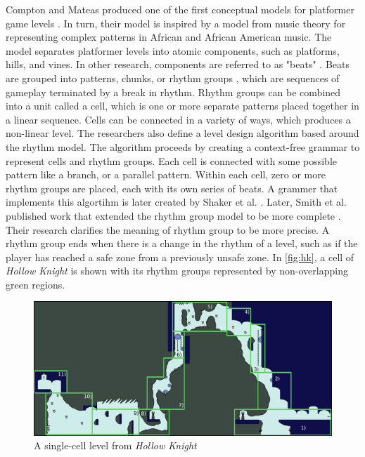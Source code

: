 Compton and Mateas produced one of the first conceptual models for platformer game levels
\cite{compton2006}. In turn, their model is inspired by a model from music theory for
representing complex patterns in African and African American music. The model separates
platformer levels into atomic components, such as platforms, hills, and vines. In other
research, components are referred to as "beats" \cite{dahlskog2012, smith2008}. Beats are
grouped into patterns, chunks, or rhythm groups \cite{dahlskog2012}, which are sequences of
gameplay terminated by a break in rhythm. Rhythm groups can be combined into a unit called a
cell, which is one or more separate patterns placed together in a linear sequence. Cells can
be connected in a variety of ways, which produces a non-linear level. The researchers also
define a level design algorithm based around the rhythm model. The algorithm proceeds by
creating a context-free grammar to represent cells and rhythm groups. Each cell is connected
with some possible pattern like a branch, or a parallel pattern. Within each cell, zero or
more rhythm groups are placed, each with its own series of beats. A grammer that implements
this algortihm is later created by Shaker et al. \cite{shaker2012}. Later, Smith et al.
published work that extended the rhythm group model to be more complete \cite{smith2008}.
Their research clarifies the meaning of rhythm group to be more precise. A rhythm group ends
when there is a change in the rhythm of a level, such as if the player has reached a safe
zone from a previously unsafe zone. In \autoref{fig:hk}, a cell of \emph{Hollow Knight} is
shown with its rhythm groups represented by non-overlapping green regions.

\begin{figure}[h]
    \centering
    \includegraphics[width=\linewidth]{img/fig5-hk-rhythm.png}
    \caption{A single-cell level from \emph{Hollow Knight}}
    \label{fig:hk}
\end{figure}

